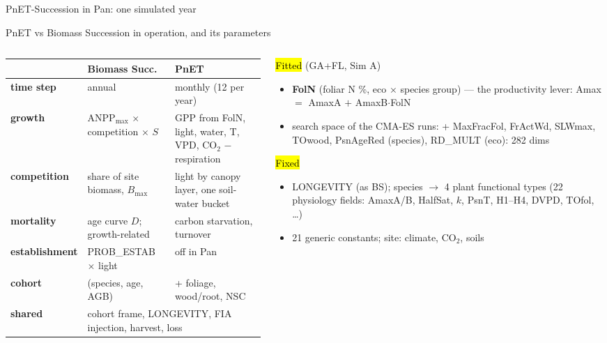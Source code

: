 \begin{frame}{PnET-Succession in Pan: one simulated year}
\vspace{0.3em}\flowlegend
{}
\end{frame}



\begin{frame}{PnET vs Biomass Succession in operation, and its parameters}
\footnotesize
\begin{columns}[T]
\begin{column}{0.53\textwidth}
\scriptsize\renewcommand{\arraystretch}{1.12}
\begin{tabular}{@{}>{\bfseries}p{1.45cm}p{2.05cm}p{2.75cm}@{}}
\toprule
 & Biomass Succ. & PnET \\
\midrule
time step & annual & monthly (12 per year) \\
growth & ANPP$_{\max}$ $\times$ competition $\times$ $S$ & GPP from FolN, light, water, T, VPD, CO$_2$ $-$ respiration \\
competition & share of site biomass, $B_{\max}$ & light by canopy layer, one soil-water bucket \\
mortality & age curve $D$; growth-related & carbon starvation, turnover \\
establishment & PROB\_ESTAB $\times$ light & off in Pan \\
cohort & (species, age, AGB) & + foliage, wood/root, NSC \\
shared & \multicolumn{2}{p{4.9cm}}{cohort frame, LONGEVITY, FIA injection, harvest, loss} \\
\bottomrule
\end{tabular}
\end{column}
\begin{column}{0.46\textwidth}
\hl{Fitted} (GA+FL, Sim A)
\begin{itemize}\setlength\itemsep{0pt}
\item \textbf{FolN} (foliar N \%, eco $\times$ species group) — the productivity lever: Amax $=$ AmaxA $+$ AmaxB$\cdot$FolN
\item search space of the CMA-ES runs: + MaxFracFol, FrActWd, SLWmax, TOwood, PsnAgeRed (species), RD\_MULT (eco): 282 dims
\end{itemize}
\hl{Fixed}
\begin{itemize}\setlength\itemsep{0pt}
\item LONGEVITY (as BS); species $\rightarrow$ 4 plant functional types (22 physiology fields: AmaxA/B, HalfSat, $k$, PsnT, H1–H4, DVPD, TOfol, \dots)
\item 21 generic constants; site: climate, CO$_2$, soils
\end{itemize}
\end{column}
\end{columns}
\end{frame}

